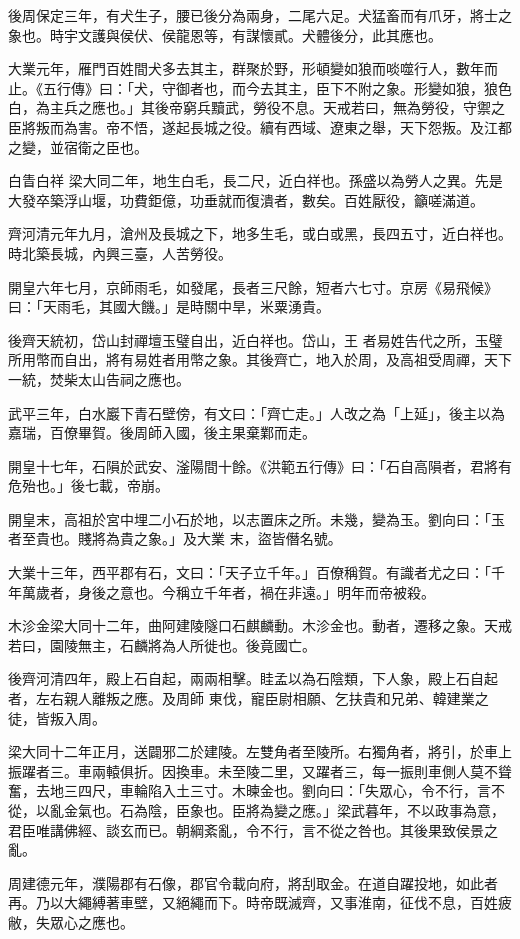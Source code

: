 \begin{pinyinscope}
 後周保定三年，有犬生子，腰已後分為兩身，二尾六足。犬猛畜而有爪牙，將士之象也。時宇文護與侯伏、侯龍恩等，有謀懷貳。犬體後分，此其應也。



 大業元年，雁門百姓間犬多去其主，群聚於野，形頓變如狼而啖噬行人，數年而止。《五行傳》曰：「犬，守御者也，而今去其主，臣下不附之象。形變如狼，狼色白，為主兵之應也。」其後帝窮兵黷武，勞役不息。天戒若曰，無為勞役，守禦之臣將叛而為害。帝不悟，遂起長城之役。續有西域、遼東之舉，天下怨叛。及江都之變，並宿衛之臣也。



 白眚白祥
 梁大同二年，地生白毛，長二尺，近白祥也。孫盛以為勞人之異。先是大發卒築浮山堰，功費鉅億，功垂就而復潰者，數矣。百姓厭役，籲嗟滿道。



 齊河清元年九月，滄州及長城之下，地多生毛，或白或黑，長四五寸，近白祥也。時北築長城，內興三臺，人苦勞役。



 開皇六年七月，京師雨毛，如發尾，長者三尺餘，短者六七寸。京房《易飛候》曰：「天雨毛，其國大饑。」是時關中旱，米粟湧貴。



 後齊天統初，岱山封禪壇玉璧自出，近白祥也。岱山，王
 者易姓告代之所，玉璧所用幣而自出，將有易姓者用幣之象。其後齊亡，地入於周，及高祖受周禪，天下一統，焚柴太山告祠之應也。



 武平三年，白水巖下青石壁傍，有文曰：「齊亡走。」人改之為「上延」，後主以為嘉瑞，百僚畢賀。後周師入國，後主果棄鄴而走。



 開皇十七年，石隕於武安、滏陽間十餘。《洪範五行傳》曰：「石自高隕者，君將有危殆也。」後七載，帝崩。



 開皇末，高祖於宮中埋二小石於地，以志置床之所。未幾，變為玉。劉向曰：「玉者至貴也。賤將為貴之象。」及大業
 末，盜皆僭名號。



 大業十三年，西平郡有石，文曰：「天子立千年。」百僚稱賀。有識者尤之曰：「千年萬歲者，身後之意也。今稱立千年者，禍在非遠。」明年而帝被殺。



 木沴金梁大同十二年，曲阿建陵隧口石麒麟動。木沴金也。動者，遷移之象。天戒若曰，園陵無主，石麟將為人所徙也。後竟國亡。



 後齊河清四年，殿上石自起，兩兩相擊。眭孟以為石陰類，下人象，殿上石自起者，左右親人離叛之應。及周師
 東伐，寵臣尉相願、乞扶貴和兄弟、韓建業之徒，皆叛入周。



 梁大同十二年正月，送闢邪二於建陵。左雙角者至陵所。右獨角者，將引，於車上振躍者三。車兩轅俱折。因換車。未至陵二里，又躍者三，每一振則車側人莫不聳奮，去地三四尺，車輪陷入土三寸。木暕金也。劉向曰：「失眾心，令不行，言不從，以亂金氣也。石為陰，臣象也。臣將為變之應。」梁武暮年，不以政事為意，君臣唯講佛經、談玄而已。朝綱紊亂，令不行，言不從之咎也。其後果致侯景之亂。



 周建德元年，濮陽郡有石像，郡官令載向府，將刮取金。在道自躍投地，如此者再。乃以大繩縛著車壁，又絕繩而下。時帝既滅齊，又事淮南，征伐不息，百姓疲敝，失眾心之應也。



\end{pinyinscope}